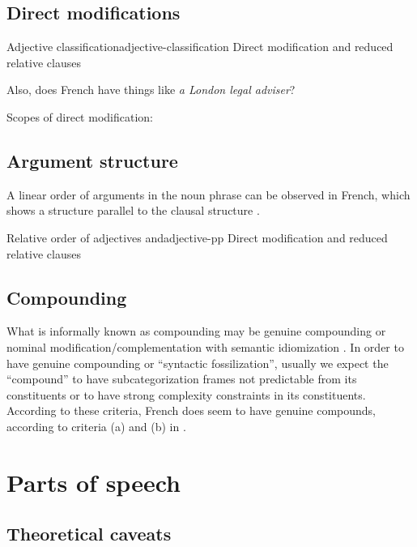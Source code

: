 \documentclass[a4paper, oneside, 12pt]{report}
\newcommand*{\citesec}[1]{\S~{#1}}
\newcommand*{\citechap}[1]{chap.~{#1}}
\newcommand*{\citepage}[1]{p.~{#1}}
\newcommand{\form}[1]{\emph{#1}}
\begin{document}
\subsection{Direct modifications}\label{sec:grammatical.np.direct-modify}

\begin{todobox}{Adjective classification}{adjective-classification}
    Direct modification and reduced relative clauses

    Also, does French have things like \form{a London legal adviser}?
    
    Scopes of direct modification: \citep[\citesec{3.7.1}]{rowlett2007syntax}
\end{todobox}


\subsection{Argument structure}

A linear order of arguments in the noun phrase can be observed in French,
which shows a structure parallel to the clausal structure \citep[\citepage{21}]{rowlett2007syntax}.

\begin{todobox}{Relative order of adjectives and}{adjective-pp}
    Direct modification and reduced relative clauses
\end{todobox}

\subsection{Compounding}\label{sec:grammatical.np.compound}

What is informally known as compounding may be 
genuine compounding or nominal modification/complementation with semantic idiomization
\citep[\citechap{5}, \citesec{14.4}]{cgel}.
In order to have genuine compounding or ``syntactic fossilization'',
usually we expect the ``compound'' to have subcategorization frames
not predictable from its constituents
or to have strong complexity constraints in its constituents.
According to these criteria, French does seem to have genuine compounds,
according to criteria (a) and (b) in \citet[\citepage{15}]{rowlett2007syntax}.

\section{Parts of speech}

\subsection{Theoretical caveats}\label{sec:grammatical.pos.theory}
\end{document}
